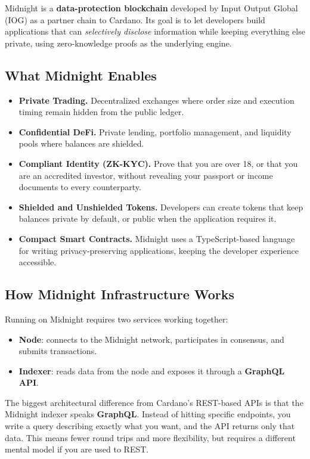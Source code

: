 Midnight is a \textbf{data-protection blockchain} developed by Input Output Global (IOG) as a partner chain to Cardano. Its goal is to let developers build applications that can \emph{selectively disclose} information while keeping everything else private, using zero-knowledge proofs as the underlying engine.

\subsection*{What Midnight Enables}

\begin{itemize}
  \item \textbf{Private Trading.} Decentralized exchanges where order size and execution timing remain hidden from the public ledger.
  \item \textbf{Confidential DeFi.} Private lending, portfolio management, and liquidity pools where balances are shielded.
  \item \textbf{Compliant Identity (ZK-KYC).} Prove that you are over 18, or that you are an accredited investor, without revealing your passport or income documents to every counterparty.
  \item \textbf{Shielded and Unshielded Tokens.} Developers can create tokens that keep balances private by default, or public when the application requires it.
  \item \textbf{Compact Smart Contracts.} Midnight uses a TypeScript-based language for writing privacy-preserving applications, keeping the developer experience accessible.
\end{itemize}

\subsection*{How Midnight Infrastructure Works}

Running on Midnight requires two services working together:

\begin{itemize}
  \item \textbf{Node}: connects to the Midnight network, participates in consensus, and submits transactions.
  \item \textbf{Indexer}: reads data from the node and exposes it through a \textbf{GraphQL API}.
\end{itemize}

\begin{remark}
The biggest architectural difference from Cardano's REST-based APIs is that the Midnight indexer speaks \textbf{GraphQL}. Instead of hitting specific endpoints, you write a query describing exactly what you want, and the API returns only that data. This means fewer round trips and more flexibility, but requires a different mental model if you are used to REST.
\end{remark}

